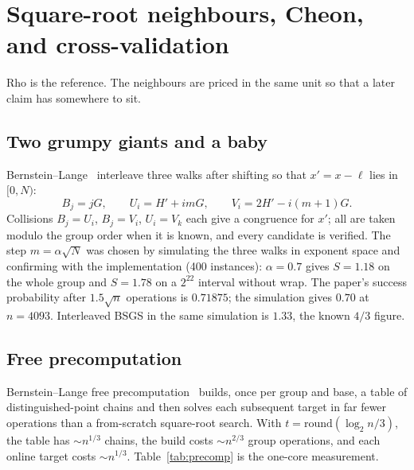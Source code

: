\section{Square-root neighbours, Cheon, and cross-validation}
\label{sec:rho-variants}

Rho is the reference. The neighbours are priced in the same unit so
that a later claim has somewhere to sit.

\subsection{Two grumpy giants and a baby}

Bernstein--Lange~\cite{bernsteinlange2012grumpy} interleave three walks
after shifting so that $x'=x-\ell$ lies in $[0,N)$:
\[
  B_j = jG,\qquad
  U_i = H' + imG,\qquad
  V_i = 2H' - i(m+1)G.
\]
Collisions $B_j=U_i$, $B_j=V_i$, $U_i=V_k$ each give a congruence for
$x'$; all are taken modulo the group order when it is known, and every
candidate is verified. The step $m=\alpha\sqrt{N}$ was chosen by
simulating the three walks in exponent space and confirming with the
implementation (400 instances): $\alpha=0.7$ gives $S=1.18$ on the
whole group and $S=1.78$ on a $2^{22}$ interval without wrap. The
paper's success probability after $1.5\sqrt{n}$ operations is
$0.71875$; the simulation gives $0.70$ at $n=4093$. Interleaved BSGS
in the same simulation is $1.33$, the known $4/3$
figure.

\subsection{Free precomputation}

Bernstein--Lange free precomputation~\cite{bernsteinlange2012small,bernsteinlange2013}
builds, once per group and base, a table of distinguished-point chains
and then solves each subsequent target in far fewer operations than a
from-scratch square-root search. With $t=\mathrm{round}(\log_2 n/3)$,
the table has $\sim n^{1/3}$ chains, the build costs $\sim n^{2/3}$
group operations, and each online target costs $\sim n^{1/3}$.
Table~\ref{tab:precomp} is the one-core measurement.

